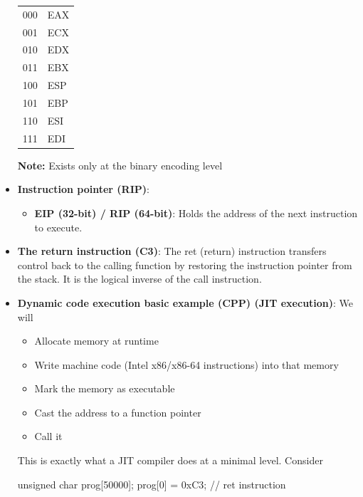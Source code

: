 \documentclass{report}
\begin{document}
\begin{itemize}
\begin{center}
\begin{tabularx}{\textwidth}{@{}XX@{}}
                    000	&EAX\\[2ex]
                    001	&ECX\\[2ex]
                    010	&EDX\\[2ex]
                    011	&EBX\\[2ex]
                    100	&ESP\\[2ex]
                    101	&EBP\\[2ex]
                    110	&ESI\\[2ex]
                    111	&EDI\\
                    \bottomrule
                \end{tabularx}
            \end{center}
            \textbf{Note:} Exists only at the binary encoding level
        \item \textbf{Instruction pointer (RIP)}: 
            \begin{itemize}
                \item \textbf{EIP (32-bit) / RIP (64-bit)}: Holds the address of the next instruction to execute.
            \end{itemize}
        \item \textbf{The return instruction (C3)}: The ret (return) instruction transfers control back to the calling function by restoring the instruction pointer from the stack. It is the logical inverse of the call instruction.
        \item \textbf{Dynamic code execution basic example (CPP) (JIT execution)}: We will 
            \begin{itemize}
                \item Allocate memory at runtime
                \item Write machine code (Intel x86/x86-64 instructions) into that memory
                \item Mark the memory as executable
                \item Cast the address to a function pointer
                \item Call it
            \end{itemize}
            This is exactly what a JIT compiler does at a minimal level. Consider 
            \bigbreak \noindent 
            \begin{cppcode}
                unsigned char prog[50000];
                prog[0] = 0xC3; // ret instruction


\end{cppcode}
\end{itemize}
\end{document}
